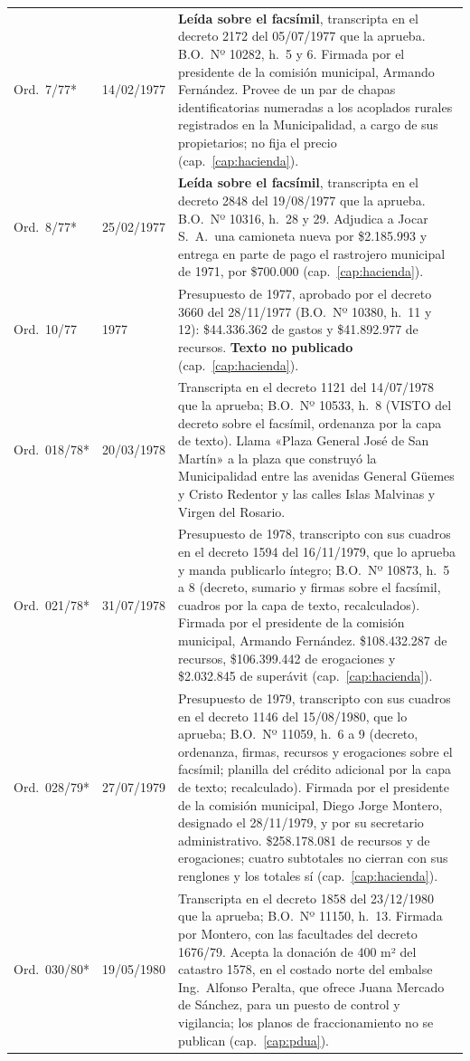 \begin{longtable}{@{}p{2.6cm}p{2.2cm}p{8.2cm}@{}}
Ord.\ 7/77* & 14/02/1977 & \textbf{Leída sobre el facsímil}, transcripta en el decreto 2172 del 05/07/1977 que la aprueba. B.O.\ Nº 10282, h.\ 5 y 6. Firmada por el presidente de la comisión municipal, Armando Fernández. Provee de un par de chapas identificatorias numeradas a los acoplados rurales registrados en la Municipalidad, a cargo de sus propietarios; no fija el precio (cap.\ \ref{cap:hacienda}). \\
Ord.\ 8/77* & 25/02/1977 & \textbf{Leída sobre el facsímil}, transcripta en el decreto 2848 del 19/08/1977 que la aprueba. B.O.\ Nº 10316, h.\ 28 y 29. Adjudica a Jocar S.\ A.\ una camioneta nueva por \$2.185.993 y entrega en parte de pago el rastrojero municipal de 1971, por \$700.000 (cap.\ \ref{cap:hacienda}). \\
Ord.\ 10/77 & 1977 & Presupuesto de 1977, aprobado por el decreto 3660 del 28/11/1977 (B.O.\ Nº 10380, h.\ 11 y 12): \$44.336.362 de gastos y \$41.892.977 de recursos. \textbf{Texto no publicado} (cap.\ \ref{cap:hacienda}). \\
Ord.\ 018/78* & 20/03/1978 & Transcripta en el decreto 1121 del 14/07/1978 que la aprueba; B.O.\ Nº 10533, h.\ 8 (VISTO del decreto sobre el facsímil, ordenanza por la capa de texto). Llama «Plaza General José de San Martín» a la plaza que construyó la Municipalidad entre las avenidas General Güemes y Cristo Redentor y las calles Islas Malvinas y Virgen del Rosario. \\
Ord.\ 021/78* & 31/07/1978 & Presupuesto de 1978, transcripto con sus cuadros en el decreto 1594 del 16/11/1979, que lo aprueba y manda publicarlo íntegro; B.O.\ Nº 10873, h.\ 5 a 8 (decreto, sumario y firmas sobre el facsímil, cuadros por la capa de texto, recalculados). Firmada por el presidente de la comisión municipal, Armando Fernández. \$108.432.287 de recursos, \$106.399.442 de erogaciones y \$2.032.845 de superávit (cap.\ \ref{cap:hacienda}). \\
Ord.\ 028/79* & 27/07/1979 & Presupuesto de 1979, transcripto con sus cuadros en el decreto 1146 del 15/08/1980, que lo aprueba; B.O.\ Nº 11059, h.\ 6 a 9 (decreto, ordenanza, firmas, recursos y erogaciones sobre el facsímil; planilla del crédito adicional por la capa de texto; recalculado). Firmada por el presidente de la comisión municipal, Diego Jorge Montero, designado el 28/11/1979, y por su secretario administrativo. \$258.178.081 de recursos y de erogaciones; cuatro subtotales no cierran con sus renglones y los totales sí (cap.\ \ref{cap:hacienda}). \\
Ord.\ 030/80* & 19/05/1980 & Transcripta en el decreto 1858 del 23/12/1980 que la aprueba; B.O.\ Nº 11150, h.\ 13. Firmada por Montero, con las facultades del decreto 1676/79. Acepta la donación de 400 m² del catastro 1578, en el costado norte del embalse Ing.\ Alfonso Peralta, que ofrece Juana Mercado de Sánchez, para un puesto de control y vigilancia; los planos de fraccionamiento no se publican (cap.\ \ref{cap:pdua}). \\

\end{longtable}
